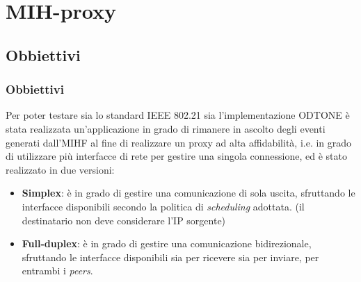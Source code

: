 \documentclass[10pt]{beamer}
\begin{document}
\section{MIH-proxy}
\subsection{Obbiettivi}
\begin{frame}
\frametitle{Obbiettivi}
Per poter testare sia lo standard IEEE 802.21 sia l'implementazione ODTONE è stata realizzata un'applicazione in grado di rimanere in ascolto degli eventi generati dall'MIHF al fine di realizzare un proxy ad alta affidabilità, i.e. in grado di utilizzare più interfacce di rete per gestire una singola connessione, ed è stato realizzato in due versioni:
\begin{itemize}
\item \textbf{Simplex}: è in grado di gestire una comunicazione di sola uscita, sfruttando le interfacce disponibili secondo la politica di {\em scheduling} adottata. (il destinatario non deve considerare l'IP sorgente)
\item \textbf{Full-duplex}: è in grado di gestire una comunicazione bidirezionale, sfruttando le interfacce disponibili sia per ricevere sia per inviare, per entrambi i {\em peers}.
\end{itemize}

\end{frame}
\end{document}
